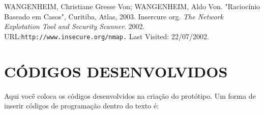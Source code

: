 \documentclass[brazil]{abnt-UVV/abnt-uvv}
\begin{document}
















{}




\begin{thebibliography}{widest entry}
 WANGENHEIM, Christiane Gresse Von; WANGENHEIM, Aldo Von. "Raciocínio Baseado em Casos", Curitiba, Atlas, 2003.
 Insercure org. \emph{The Network Explotation Tool and Security Scanner}. 2002. URL:\verb+http://www.insecure.org/nmap.+ Last Visited: 22/07/2002.
\end{thebibliography}





\anexo

\chapter*{CÓDIGOS DESENVOLVIDOS}

Aqui você coloca os códigos desenvolvidos na criação do protótipo.
Um forma de inserir códigos de programação dentro do texto é:
\end{document}
